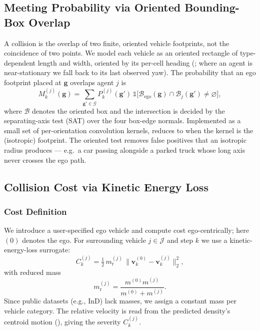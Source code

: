 \documentclass[journal]{IEEEtran}
\begin{document}
\subsection{Meeting Probability via Oriented Bounding-Box Overlap}\label{sec:box_overlap}
A collision is the overlap of two finite, oriented vehicle footprints, not the coincidence of two points. We model each vehicle as an oriented rectangle of type-dependent length and width, oriented by its per-cell heading (; where an agent is near-stationary we fall back to its last observed yaw). The probability that an ego footprint placed at $\mathbf{g}$ overlaps agent $j$ is
\begin{equation}
M^{(j)}_{k}(\mathbf{g})=\sum_{\mathbf{g}'\in\mathcal{G}} P^{(j)}_{k}(\mathbf{g}')\,\mathbb{1}\!\big[\mathcal{B}_{\mathrm{ego}}(\mathbf{g})\cap\mathcal{B}_{j}(\mathbf{g}')\neq\varnothing\big],
\label{eq:box_overlap}
\end{equation}
where $\mathcal{B}$ denotes the oriented box and the intersection is decided by the separating-axis test (SAT) over the four box-edge normals. Implemented as a small set of per-orientation convolution kernels,  reduces to  when the kernel is the (isotropic) footprint. The oriented test removes false positives that an isotropic radius produces --- e.g.\ a car passing alongside a parked truck whose long axis never crosses the ego path.

\subsection{Collision Cost via Kinetic Energy Loss}\label{sec:collision_cost}
\subsubsection{Cost Definition}\label{sec:cost_definition}
We introduce a user-specified ego vehicle and compute cost ego-centrically; here $(0)$ denotes the ego. For surrounding vehicle $j\in\mathcal{J}$ and step $k$ we use a kinetic-energy-loss surrogate:
\begin{equation}
C^{(j)}_{k}=\tfrac{1}{2}\,m^{(j)}_{\mathrm{r}}\,\big\|\mathbf{v}^{(0)}_{k}-\mathbf{v}^{(j)}_{k}\big\|_2^2,
\label{eq:collision_cost}
\end{equation}
with reduced mass
\begin{equation}
m^{(j)}_{\mathrm{r}}=\frac{m^{(0)}m^{(j)}}{m^{(0)}+m^{(j)}}.
\label{eq:reduced_mass}
\end{equation}
Since public datasets (e.g., InD) lack masses, we assign a constant mass per vehicle category. The relative velocity is read from the predicted density's centroid motion (), giving the severity $C^{(j)}_{k}$.
\end{document}

